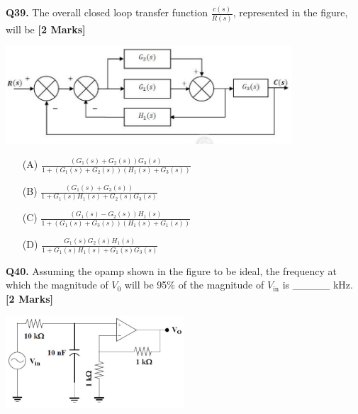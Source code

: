 \documentclass[11pt]{article}
\newcommand{\questionb}[2]{
    \noindent\textbf{Q#2.} #1 \hfill \textbf{[2 Marks]}
}
\begin{document}
\questionb{The overall closed loop transfer function \(\frac{c(s)}{R(s)}\), represented in the figure, will be}{39}
\begin{center}
\includegraphics[width=0.8\textwidth]{figures/39.png}
\end{center}
\begin{enumerate}
    \item[(A)] \(\frac{(G_1(s)+G_2(s))G_3(s)}{1+(G_1(s)+G_2(s))(H_1(s)+G_3(s))}\)
    \item[(B)] \(\frac{(G_1(s)+G_3(s))}{1+G_1(s)H_1(s)+G_2(s)G_3(s)}\)
    \item[(C)] \(\frac{(G_1(s)-G_2(s))H_1(s)}{1+(G_1(s)+G_3(s))(H_1(s)+G_1(s))}\)
    \item[(D)] \(\frac{G_1(s)G_2(s)H_1(s)}{1+G_1(s)H_1(s)+G_1(s)G_3(s)}\)
\end{enumerate}
\vspace{0.5cm}

\questionb{Assuming the opamp shown in the figure to be ideal, the frequency at which the magnitude of \(V_0\) will be 95\% of the magnitude of \(V_{\text{in}}\) is \_\_\_\_\_ kHz.}{40}
\begin{center}
\includegraphics[width=0.5\textwidth]{figures/40.png}
\end{center}
\vspace{0.5cm}
\end{document}

